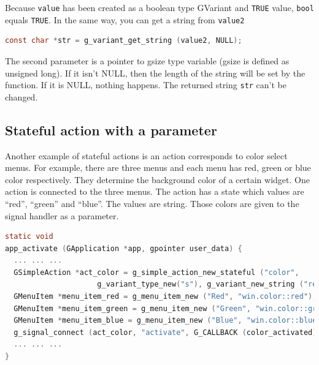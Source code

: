 Because \passthrough{\lstinline!value!} has been created as a boolean
type GVariant and \passthrough{\lstinline!TRUE!} value,
\passthrough{\lstinline!bool!} equals \passthrough{\lstinline!TRUE!}. In
the same way, you can get a string from \passthrough{\lstinline!value2!}

\begin{lstlisting}[language=C]
const char *str = g_variant_get_string (value2, NULL);
\end{lstlisting}

The second parameter is a pointer to gsize type variable (gsize is
defined as unsigned long). If it isn't NULL, then the length of the
string will be set by the function. If it is NULL, nothing happens. The
returned string \passthrough{\lstinline!str!} can't be changed.

\hypertarget{stateful-action-with-a-parameter}{%
\subsection{Stateful action with a
parameter}\label{stateful-action-with-a-parameter}}

Another example of stateful actions is an action corresponds to color
select menus. For example, there are three menus and each menu has red,
green or blue color respectively. They determine the background color of
a certain widget. One action is connected to the three menus. The action
has a state which values are ``red'', ``green'' and ``blue''. The values
are string. Those colors are given to the signal handler as a parameter.

\begin{lstlisting}[language=C]
static void
app_activate (GApplication *app, gpointer user_data) {
  ... ... ...
  GSimpleAction *act_color = g_simple_action_new_stateful ("color",
                     g_variant_type_new("s"), g_variant_new_string ("red"));
  GMenuItem *menu_item_red = g_menu_item_new ("Red", "win.color::red");
  GMenuItem *menu_item_green = g_menu_item_new ("Green", "win.color::green");
  GMenuItem *menu_item_blue = g_menu_item_new ("Blue", "win.color::blue");
  g_signal_connect (act_color, "activate", G_CALLBACK (color_activated), win);
  ... ... ...
}
\end{lstlisting}

